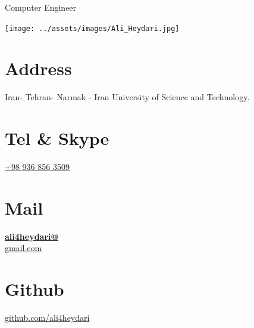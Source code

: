 \documentclass[a4paper]{friggeri-cv}
\begin{document}
    {Computer Engineer}


    \begin{aside}
        \texttt{[image: ../assets/images/Ali\_Heydari.jpg]}
        \section{Address}\label{sec:address}
        Iran- Tehran- Narmak -
        Iran University of Science and Technology.
        ~
        \section{Tel \& Skype}\label{sec:tel&skype}
        \href{tel:+989368563509}{+98 936 856 3509}
        ~
        \section{Mail}\label{sec:mail}
        \href{mailto:ali4heydari@gmail.com}{\textbf{ali4heydari@}\\gmail.com}
        ~
        \section{Github}\label{sec:git}
        \href{https://github.com/ali4heydari}{github.com/ali4heydari}

\end{aside}
\end{document}
